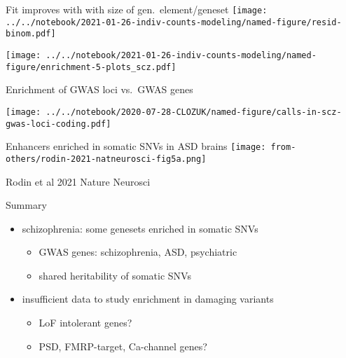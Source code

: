 \documentclass[usenames,dvipsnames]{beamer}
\begin{document}
\begin{frame}{Fit improves with with size of gen.~element/geneset}
\texttt{[image: ../../notebook/2021-01-26-indiv-counts-modeling/named-figure/resid-binom.pdf]}
\end{frame}

\begin{frame}[label=results]
\texttt{[image: ../../notebook/2021-01-26-indiv-counts-modeling/named-figure/enrichment-5-plots\_scz.pdf]}
\end{frame}

\begin{frame}{Enrichment of GWAS loci vs.~GWAS genes}
\begin{center}
\texttt{[image: ../../notebook/2020-07-28-CLOZUK/named-figure/calls-in-scz-gwas-loci-coding.pdf]}
\end{center}
\end{frame}





\begin{frame}{Enhancers enriched in somatic SNVs in ASD brains}
\texttt{[image: from-others/rodin-2021-natneurosci-fig5a.png]}

\tiny
Rodin et al 2021 Nature Neurosci
\end{frame}

\begin{frame}{Summary}
\begin{itemize}
\item schizophrenia: some genesets enriched in somatic SNVs
\begin{itemize}
	\item GWAS genes: schizophrenia, ASD, psychiatric 
        \item shared heritability of somatic SNVs
\end{itemize}
\item insufficient data to study enrichment in damaging variants
\begin{itemize}
	\item LoF intolerant genes?
	\item PSD, FMRP-target, Ca-channel genes?
\end{itemize}
\end{itemize}
\end{frame}
\end{document}
